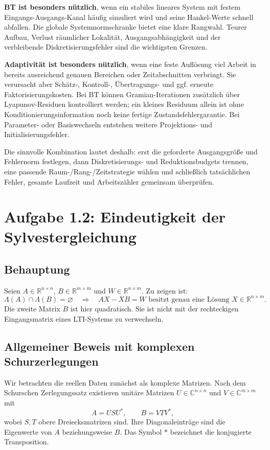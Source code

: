 \documentclass[11pt,a4paper]{article}
\newcommand{\R}{\mathbb{R}}
\begin{document}
\textbf{BT ist besonders nützlich}, wenn ein stabiles lineares System mit festem Eingangs-Ausgangs-Kanal häufig simuliert wird und seine Hankel-Werte schnell abfallen. Die globale Systemnormschranke bietet eine klare Rangwahl. Teurer Aufbau, Verlust räumlicher Lokalität, Ausgangsabhängigkeit und der verbleibende Diskretisierungsfehler sind die wichtigsten Grenzen.

\textbf{Adaptivität ist besonders nützlich}, wenn eine feste Auflösung viel Arbeit in bereits ausreichend genauen Bereichen oder Zeitabschnitten verbringt. Sie verursacht aber Schätz-, Kontroll-, Übertragungs- und ggf. erneute Faktorisierungskosten. Bei BT können Gramian-Iterationen zusätzlich über Lyapunov-Residuen kontrolliert werden; ein kleines Residuum allein ist ohne Konditionierungsinformation noch keine fertige Zustandsfehlergarantie. Bei Parameter- oder Basiswechseln entstehen weitere Projektions- und Initialisierungsfehler.

Die sinnvolle Kombination lautet deshalb: erst die geforderte Ausgangsgröße und Fehlernorm festlegen, dann Diskretisierungs- und Reduktionsbudgets trennen, eine passende Raum-/Rang-/Zeitstrategie wählen und schließlich tatsächlichen Fehler, gesamte Laufzeit und Arbeitszähler gemeinsam überprüfen.


\clearpage

\section{Aufgabe 1.2: Eindeutigkeit der Sylvestergleichung}\label{sec:sylvester}
\subsection{Behauptung}
Seien $A\in\R^{n\times n}$, $B\in\R^{m\times m}$ und $W\in\R^{n\times m}$. Zu zeigen ist:
\begin{equation}
 \Lambda(A)\cap\Lambda(B)=\varnothing
 \quad\Longrightarrow\quad
 AX-XB=W\text{ besitzt genau eine Lösung }X\in\R^{n\times m}.
\end{equation}
Die zweite Matrix $B$ ist hier quadratisch. Sie ist nicht mit der rechteckigen Eingangsmatrix eines LTI-Systems zu verwechseln.

\subsection{Allgemeiner Beweis mit komplexen Schurzerlegungen}
Wir betrachten die reellen Daten zunächst als komplexe Matrizen. Nach dem Schurschen Zerlegungssatz existieren unitäre Matrizen $U\in\mathbb C^{n\times n}$ und $V\in\mathbb C^{m\times m}$ mit
\begin{equation}
 A=USU^*,\qquad B=VTV^*,
\end{equation}
wobei $S,T$ obere Dreiecksmatrizen sind. Ihre Diagonaleinträge sind die Eigenwerte von $A$ beziehungsweise $B$. Das Symbol $*$ bezeichnet die konjugierte Transposition.
\end{document}
